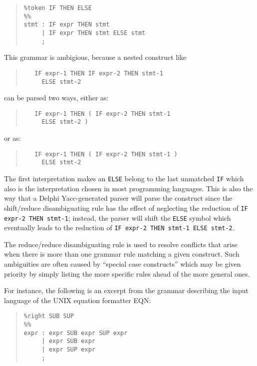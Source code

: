 \documentclass[a4paper]{article}
\begin{document}
\begin{quote}\begin{verbatim}
%token IF THEN ELSE
%%
stmt : IF expr THEN stmt
     | IF expr THEN stmt ELSE stmt
     ;
\end{verbatim}\end{quote}

This grammar is ambigious, because a nested construct like
\begin{quote}\begin{verbatim}
   IF expr-1 THEN IF expr-2 THEN stmt-1
     ELSE stmt-2
\end{verbatim}\end{quote}
can be parsed two ways, either as:
\begin{quote}\begin{verbatim}
   IF expr-1 THEN ( IF expr-2 THEN stmt-1
     ELSE stmt-2 )
\end{verbatim}\end{quote}
or as:
\begin{quote}\begin{verbatim}
   IF expr-1 THEN ( IF expr-2 THEN stmt-1 )
     ELSE stmt-2
\end{verbatim}\end{quote}

The first interpretation makes an \verb"ELSE" belong to the last unmatched
\verb"IF" which also is the interpretation chosen in most programming
languages. This is also the way that a Delphi Yacc-generated parser will parse
the construct since the shift/reduce disambiguating rule has the effect of
neglecting the reduction of \verb"IF expr-2 THEN stmt-1"; instead, the parser
will shift the \verb"ELSE" symbol which eventually leads to the reduction of
\verb"IF expr-2 THEN stmt-1 ELSE stmt-2".

The reduce/reduce disambiguating rule is used to resolve conflicts that
arise when there is more than one grammar rule matching a given construct.
Such ambiguities are often caused by ``special case constructs'' which may be
given priority by simply listing the more specific rules ahead of the more
general ones.

For instance, the following is an excerpt from the grammar describing the
input language of the UNIX equation formatter EQN:

\begin{quote}\begin{verbatim}
%right SUB SUP
%%
expr : expr SUB expr SUP expr
     | expr SUB expr
     | expr SUP expr
     ;
\end{verbatim}\end{quote}
\end{document}
